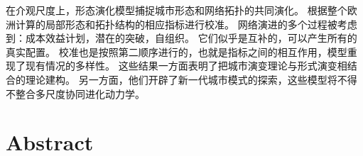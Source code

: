 {在介观尺度上，形态演化模型捕捉城市形态和网络拓扑的共同演化。%
根据整个欧洲计算的局部形态和拓扑结构的相应指标进行校准。%
网络演进的多个过程被考虑到：成本效益计划，潜在的突破，自组织。 它们似乎是互补的，可以产生所有的真实配置。%
校准也是按照第二顺序进行的，也就是指标之间的相互作用，模型重现了现有情况的多样性。%
这些结果一方面表明了把城市演变理论与形式演变相结合的理论建构。 另一方面，他们开辟了新一代城市模式的探索，这些模型将不得不整合多尺度协同进化动力学。%
}






\newpage

\chapter*{Abstract}












